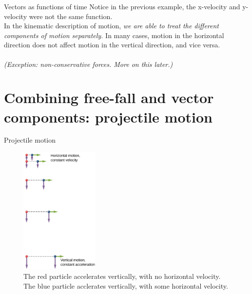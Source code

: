 \documentclass{beamer}
\begin{document}
\begin{frame}{Vectors as functions of time}
Notice in the previous example, the x-velocity and y-velocity were not the same function. \\
\vspace{0.5cm}
In the kinematic description of motion, \alert{\textit{we are able to treat the different components of motion separately.}}  In many cases, motion in the horizontal direction does not affect motion in the vertical direction, and vice versa.\\
\vspace{0.5cm}
\small
{} \\
\vspace{1cm}
\textit{(Exception: non-conservative forces.  More on this later.)}
\end{frame}

\section{Combining free-fall and vector components: projectile motion}

\begin{frame}{Projectile motion}
\small
\begin{figure}
\centering
\includegraphics[width=0.35\textwidth]{figures/fall.png}
\caption{\label{fig:fall} The red particle accelerates vertically, with no horizontal velocity.  The blue particle acclerates vertically, with some horizontal velocity.}
\end{figure}
\end{frame}
\end{document}
